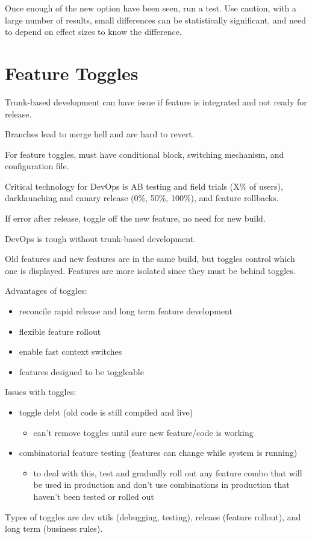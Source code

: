 \documentclass[11pt]{article}
\begin{document}
Once enough of the new option have been seen, run a test.
Use caution, with a large number of results, small differences can be statistically significant,
and need to depend on effect sizes to know the difference.
\section{Feature Toggles}
\label{sec:org2db5020}
Trunk-based development can have issue if feature is integrated and not ready for release.

Branches lead to merge hell and are hard to revert.

For feature toggles, must have conditional block, switching mechanism, and configuration file.

Critical technology for DevOps is AB testing and field trials (X\% of users), darklaunching and
canary release (0\%, 50\%, 100\%), and feature rollbacks.

If error after release, toggle off the new feature, no need for new build.

DevOps is tough without trunk-based development.

Old features and new features are in the same build, but toggles control which one is displayed.
Features are more isolated since they must be behind toggles.

Advantages of toggles:
\begin{itemize}
\item reconcile rapid release and long term feature development
\item flexible feature rollout
\item enable fast context switches
\item features designed to be toggleable
\end{itemize}

Issues with toggles:
\begin{itemize}
\item toggle debt (old code is still compiled and live)
\begin{itemize}
\item can't remove toggles until sure new feature/code is working
\end{itemize}
\item combinatorial feature testing (features can change while system is running)
\begin{itemize}
\item to deal with this, test and gradually roll out any feature combo that will be used in production and
don't use combinations in production that haven't been tested or rolled out
\end{itemize}
\end{itemize}

Types of toggles are dev utils (debugging, testing), release (feature rollout), and
long term (business rules).
\end{document}
